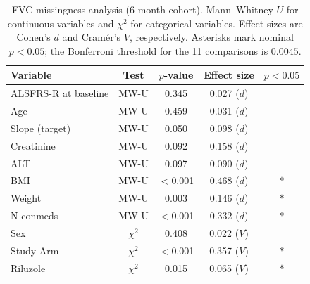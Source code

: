 \begin{table}[ht]
\centering
\caption[FVC missingness analysis, 6-month cohort]{FVC missingness analysis (6-month cohort). Mann--Whitney $U$ for continuous variables and $\chi^2$ for categorical variables. Effect sizes are Cohen's $d$ and Cramér's $V$, respectively. Asterisks mark nominal $p<0.05$; the Bonferroni threshold for the 11 comparisons is $0.0045$.}
\label{tab:fvc_missingness}
\small
\begin{tabular}{lcccc}
\toprule
Variable & Test & $p$-value & Effect size & $p<0.05$ \\
\midrule
ALSFRS-R at baseline & MW-U & 0.345 & 0.027 ($d$) &  \\
Age & MW-U & 0.459 & 0.031 ($d$) &  \\
Slope (target) & MW-U & 0.050 & 0.098 ($d$) &  \\
Creatinine & MW-U & 0.092 & 0.158 ($d$) &  \\
ALT & MW-U & 0.097 & 0.090 ($d$) &  \\
BMI & MW-U & $<$0.001 & 0.468 ($d$) & $\ast$ \\
Weight & MW-U & 0.003 & 0.146 ($d$) & $\ast$ \\
N conmeds & MW-U & $<$0.001 & 0.332 ($d$) & $\ast$ \\
Sex & $\chi^2$ & 0.408 & 0.022 ($V$) &  \\
Study Arm & $\chi^2$ & $<$0.001 & 0.357 ($V$) & $\ast$ \\
Riluzole & $\chi^2$ & 0.015 & 0.065 ($V$) & $\ast$ \\
\bottomrule
\end{tabular}
\end{table}
